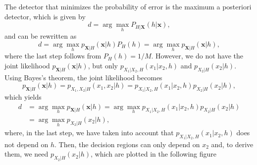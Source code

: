\begin{solution}
   The detector that minimizes the probability of error is the maximum a posteriori detector, which is given by
   \begin{equation*}
      d = \arg \mathop{\operatorname{max}}_{h} P_{H|\mathbf{X}}(h|\mathbf{x}),
    \end{equation*}
    and can be rewritten as
   \begin{equation*}
      d = \arg \mathop{\operatorname{max}}_{h} p_{\mathbf{X}|H}(\mathbf{x}|h) P_H(h) = \arg \mathop{\operatorname{max}}_{h} p_{\mathbf{X}|H}(\mathbf{x}|h),
    \end{equation*}
    where the last step follows from $P_H(h) = 1/M$. However, we do not have the joint likelihood $p_{\mathbf{X}|H}(\mathbf{x}|h)$, but only $p_{X_1|X_2,H}(x_1|x_2,h)$ and $p_{X_2|H}(x_2|h)$. Using Bayes's theorem, the joint likelihood becomes
   \begin{equation*}
      p_{\mathbf{X}|H}(\mathbf{x}|h) = p_{X_1,X_2|H}(x_1,x_2|h) = p_{X_1|X_2,H}(x_1|x_2,h) p_{X_2|H}(x_2|h),
    \end{equation*}
    which yields
   \begin{align*}
      d &= \arg \mathop{\operatorname{max}}_{h} p_{\mathbf{X}|H}(\mathbf{x}|h) = \arg \mathop{\operatorname{max}}_{h} p_{X_1|X_2,H}(x_1|x_2,h) p_{X_2|H}(x_2|h) \\ &= \arg \mathop{\operatorname{max}}_{h} p_{X_2|H}(x_2|h),
    \end{align*}
    where, in the last step, we have taken into account that $p_{X_1|X_2,H}(x_1|x_2,h)$ does not depend on $h$. Then, the decision regions can only depend on $x_2$ and, to derive them, we need $p_{X_2|H}(x_2|h)$, which are plotted in the following figure
\begin{center}
	\end{center}


\end{solution}
